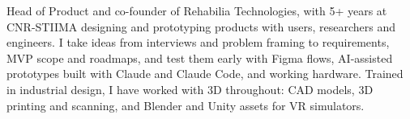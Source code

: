 {Head of Product and co-founder of Rehabilia Technologies, with 5+ years at CNR-STIIMA designing and prototyping products with users, researchers and engineers. I take ideas from interviews and problem framing to requirements, MVP scope and roadmaps, and test them early with Figma flows, AI-assisted prototypes built with Claude and Claude Code, and working hardware. Trained in industrial design, I have worked with 3D throughout: CAD models, 3D printing and scanning, and Blender and Unity assets for VR simulators.}
